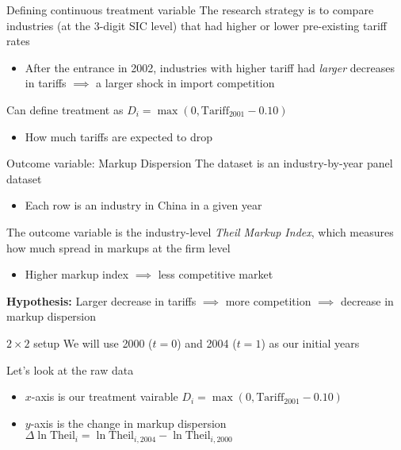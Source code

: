\documentclass[aspectratio=43,t]{beamer}
\begin{document}
\begin{frame}{Defining continuous treatment variable}
  The research strategy is to compare industries (at the 3-digit SIC level) that had higher or lower pre-existing tariff rates

  \begin{itemize}
    \item After the entrance in 2002, industries with higher tariff had \emph{larger} decreases in tariffs $\implies$ a larger shock in import competition
  \end{itemize}

  \bigskip
  Can define treatment as
  $D_i = \max (0, \text{Tariff}_{2001} - 0.10)$
  \begin{itemize}
    \item How much tariffs are expected to drop
  \end{itemize}
\end{frame}

\begin{frame}{Outcome variable: Markup Dispersion}
  The dataset is an industry-by-year panel dataset
  \begin{itemize}
    \item Each row is an industry in China in a given year
  \end{itemize}

  \bigskip
  The outcome variable is the industry-level \emph{Theil Markup Index}, which measures how much spread in markups at the firm level
  \begin{itemize}
    \item Higher markup index $\implies$ less competitive market
  \end{itemize}

  \pause
  \bigskip
  \textbf{Hypothesis:} Larger decrease in tariffs $\implies$ more competition $\implies$ decrease in markup dispersion
\end{frame}

\begin{frame}{$2 \times 2$ setup}
  We will use 2000 ($t = 0$) and 2004 ($t = 1$) as our initial years

  \bigskip
  Let's look at the raw data
  \begin{itemize}
    \item $x$-axis is our treatment vairable $D_i = \max (0, \text{Tariff}_{2001} - 0.10)$

    \item $y$-axis is the change in markup dispersion $\Delta \ln \text{Theil}_i = \ln \text{Theil}_{i, 2004} - \ln \text{Theil}_{i, 2000}$
  \end{itemize}
\end{frame}
\end{document}
